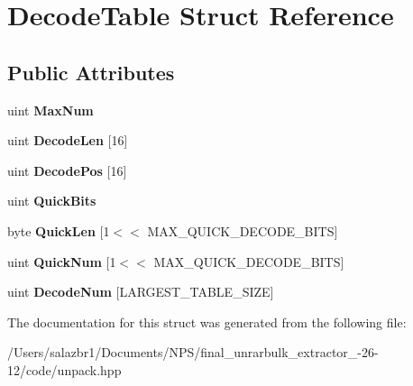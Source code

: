 \hypertarget{struct_decode_table}{\section{Decode\-Table Struct Reference}
\label{struct_decode_table}
}
\subsection*{Public Attributes}
\begin{DoxyCompactItemize}
\item 
\hypertarget{struct_decode_table_a3c8068ab36d6da313ead79119fdd162c}{uint {\bfseries Max\-Num}}\label{struct_decode_table_a3c8068ab36d6da313ead79119fdd162c}

\item 
\hypertarget{struct_decode_table_ade30adc229dd1c26d1883d2b5877461e}{uint {\bfseries Decode\-Len} \mbox{[}16\mbox{]}}\label{struct_decode_table_ade30adc229dd1c26d1883d2b5877461e}

\item 
\hypertarget{struct_decode_table_a813fb62e2aa373b95c948eb7e7214e7d}{uint {\bfseries Decode\-Pos} \mbox{[}16\mbox{]}}\label{struct_decode_table_a813fb62e2aa373b95c948eb7e7214e7d}

\item 
\hypertarget{struct_decode_table_a5688b194310750e7828a4430fd3dc6a7}{uint {\bfseries Quick\-Bits}}\label{struct_decode_table_a5688b194310750e7828a4430fd3dc6a7}

\item 
\hypertarget{struct_decode_table_a4abf7a8bb6d54688bc8ba67c0a609174}{byte {\bfseries Quick\-Len} \mbox{[}1$<$$<$ M\-A\-X\-\_\-\-Q\-U\-I\-C\-K\-\_\-\-D\-E\-C\-O\-D\-E\-\_\-\-B\-I\-T\-S\mbox{]}}\label{struct_decode_table_a4abf7a8bb6d54688bc8ba67c0a609174}

\item 
\hypertarget{struct_decode_table_adab0e0cd077022f81a0a10b2f5f3fe88}{uint {\bfseries Quick\-Num} \mbox{[}1$<$$<$ M\-A\-X\-\_\-\-Q\-U\-I\-C\-K\-\_\-\-D\-E\-C\-O\-D\-E\-\_\-\-B\-I\-T\-S\mbox{]}}\label{struct_decode_table_adab0e0cd077022f81a0a10b2f5f3fe88}

\item 
\hypertarget{struct_decode_table_aeaa83ba1918c7574968b400de91b3e6a}{uint {\bfseries Decode\-Num} \mbox{[}L\-A\-R\-G\-E\-S\-T\-\_\-\-T\-A\-B\-L\-E\-\_\-\-S\-I\-Z\-E\mbox{]}}\label{struct_decode_table_aeaa83ba1918c7574968b400de91b3e6a}

\end{DoxyCompactItemize}


The documentation for this struct was generated from the following file\-:\begin{DoxyCompactItemize}
\item 
/\-Users/salazbr1/\-Documents/\-N\-P\-S/final\-\_\-unrarbulk\-\_\-extractor\-\_-\/26-\/12/code/unpack.\-hpp\end{DoxyCompactItemize}
